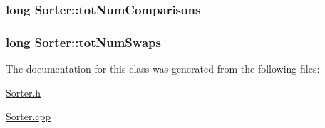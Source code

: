 \subsubsection[{\texorpdfstring{tot\+Num\+Comparisons}{totNumComparisons}}]{\setlength{\rightskip}{0pt plus 5cm}long Sorter\+::tot\+Num\+Comparisons\hspace{0.3cm}{\ttfamily [protected]}}\hypertarget{class_sorter_a28ba087dad25b8c837c1211d8d2cb8f4}{}\label{class_sorter_a28ba087dad25b8c837c1211d8d2cb8f4}
\subsubsection[{\texorpdfstring{tot\+Num\+Swaps}{totNumSwaps}}]{\setlength{\rightskip}{0pt plus 5cm}long Sorter\+::tot\+Num\+Swaps\hspace{0.3cm}{\ttfamily [protected]}}\hypertarget{class_sorter_a2fcaa452c03ec3429bedd8de1421e678}{}\label{class_sorter_a2fcaa452c03ec3429bedd8de1421e678}


The documentation for this class was generated from the following files\+:\begin{DoxyCompactItemize}
\item 
\hyperlink{_sorter_8h}{Sorter.\+h}\item 
\hyperlink{_sorter_8cpp}{Sorter.\+cpp}\end{DoxyCompactItemize}
